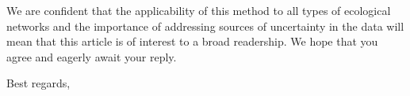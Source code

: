\documentclass[12pt]{letter}
\begin{document}
\begin{letter}
We are confident that the applicability of this method to all types of ecological networks and the importance of addressing sources of uncertainty in the data will mean that this article is of interest to a broad readership. We hope that you agree and eagerly await your reply.



\closing{Best regards,}


\end{letter}
\end{document}
